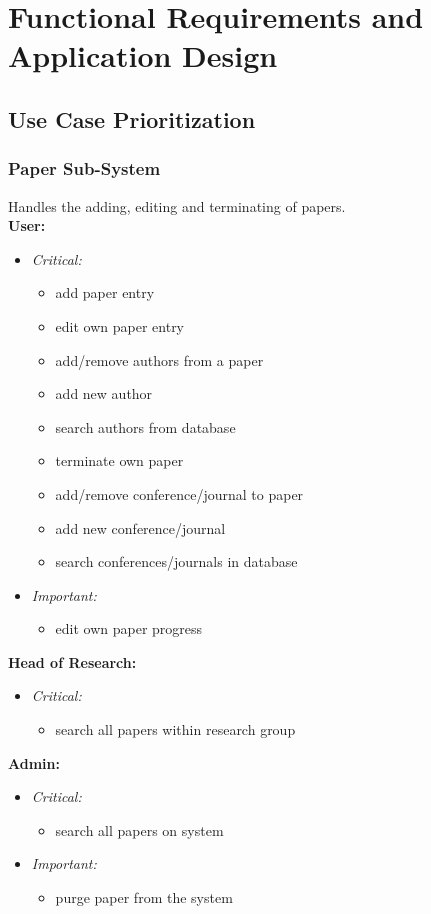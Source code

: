 \documentclass{article}
\begin{document}
	\cleardoublepage
	\section{Functional Requirements and Application Design}\label{sec:functional}
		\subsection{Use Case Prioritization}
			\subsubsection{Paper Sub-System}\label{subsubsec:priority-paper}
				Handles the adding, editing and terminating of papers.\\
				[3mm]
				\textbf{User:}
				\begin{itemize}
					\item \textit{Critical:}
					\begin{itemize}
						\item add paper entry
						\item edit own paper entry
						\item add/remove authors from a paper
						\item add new author
						\item search authors from database
						\item terminate own paper
						\item add/remove conference/journal to paper
						\item add new conference/journal
						\item search conferences/journals in database
					\end{itemize}
					
					\item \textit{Important:}
					\begin{itemize}
						\item edit own paper progress
					\end{itemize}
				\end{itemize}
				\textbf{Head of Research:}
				\begin{itemize}
					\item \textit{Critical:}
					\begin{itemize}
						\item search all papers within research group
					\end{itemize}
				\end{itemize}
				\textbf{Admin:}
				\begin{itemize}
					\item \textit{Critical:}
					\begin{itemize}
						\item search all papers on system
					\end{itemize}
					
					\item \textit{Important:}
					\begin{itemize}
						\item purge paper from the system
					\end{itemize}
				\end{itemize}
\end{document}
